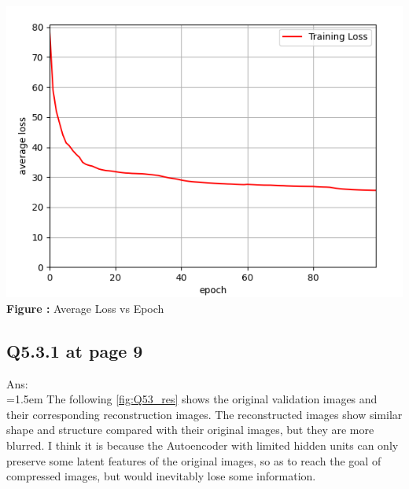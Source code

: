 \documentclass{article}
\begin{document}
	\begin{minipage}{1\linewidth}
	\centering
	\hspace{0.12\linewidth} 
	\includegraphics[width=1\linewidth]{./Q52_res.png}  %
	\newline
	\textbf{Figure \thefigure:} Average Loss vs Epoch %
	\label{fig:Q52_res}  %
	\end{minipage}
	
	\newpage	
	\subsection*{Q5.3.1 at page 9\texttt{}}
	Ans:\\
	\hangindent=1.5em \hspace{1.5em}The following \autoref{fig:Q53_res} shows the original validation images and their corresponding reconstruction images. The reconstructed images show similar shape and structure compared with their original images, but they are more blurred. I think it is because the Autoencoder with limited hidden units can only preserve some latent features of the original images, so as to reach the goal of compressed images, but would inevitably lose some information.
	\newline
\end{document}
